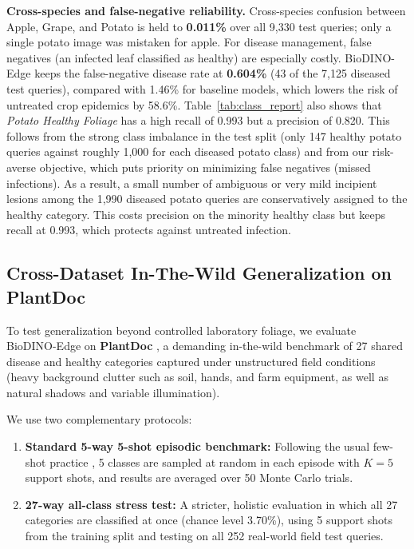 \documentclass[conference]{IEEEtran}
\begin{document}
\textbf{Cross-species and false-negative reliability.} Cross-species confusion between Apple, Grape, and Potato is held to \textbf{0.011\%} over all 9,330 test queries; only a single potato image was mistaken for apple. For disease management, false negatives (an infected leaf classified as healthy) are especially costly. BioDINO-Edge keeps the false-negative disease rate at \textbf{0.604\%} (43 of the 7,125 diseased test queries), compared with 1.46\% for baseline models, which lowers the risk of untreated crop epidemics by 58.6\%. Table~\ref{tab:class_report} also shows that \textit{Potato Healthy Foliage} has a high recall of 0.993 but a precision of 0.820. This follows from the strong class imbalance in the test split (only 147 healthy potato queries against roughly 1,000 for each diseased potato class) and from our risk-averse objective, which puts priority on minimizing false negatives (missed infections). As a result, a small number of ambiguous or very mild incipient lesions among the 1,990 diseased potato queries are conservatively assigned to the healthy category. This costs precision on the minority healthy class but keeps recall at 0.993, which protects against untreated infection.

\subsection{Cross-Dataset In-The-Wild Generalization on PlantDoc}
To test generalization beyond controlled laboratory foliage, we evaluate BioDINO-Edge on \textbf{PlantDoc} \cite{singh2020plantdoc}, a demanding in-the-wild benchmark of 27 shared disease and healthy categories captured under unstructured field conditions (heavy background clutter such as soil, hands, and farm equipment, as well as natural shadows and variable illumination).

We use two complementary protocols:
\begin{enumerate}
    \item \textbf{Standard 5-way 5-shot episodic benchmark:} Following the usual few-shot practice \cite{zhou2026vsf, zhao2026lightweight}, 5 classes are sampled at random in each episode with $K=5$ support shots, and results are averaged over 50 Monte Carlo trials.
    \item \textbf{27-way all-class stress test:} A stricter, holistic evaluation in which all 27 categories are classified at once (chance level 3.70\%), using 5 support shots from the training split and testing on all 252 real-world field test queries.
\end{enumerate}
\end{document}
